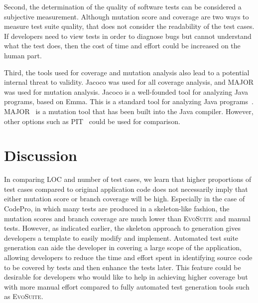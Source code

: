 Second, the determination of the quality of software tests can be considered a subjective measurement. Although mutation score and coverage are two ways to measure test suite quality, that does not consider the readability of the test cases. If developers need to view tests in order to diagnose bugs but cannot understand what the test does, then the cost of time and effort could be increased on the human part.

Third, the tools used for coverage and mutation analysis also lead to a potential internal threat to validity.  Jacoco was used for all coverage analysis, and MAJOR was used for mutation analysis.  Jacoco is a well-founded tool for analyzing Java programs, based on Emma.  This is a standard tool for analyzing Java programs~\cite{jacoco}.  MAJOR~\cite{just2011} is a mutation tool that has been built into the Java compiler. However, other options such as PIT~\cite{ pit2014} could be used for comparison. 


\section{Discussion}
\label{sec:discussion}

In comparing LOC and number of test cases, we learn that higher proportions of test cases compared to original application code does not necessarily imply that either mutation score or branch coverage will be high.  Especially in the case of CodePro, in which many tests are produced in a skeleton-like fashion, the mutation scores and branch coverage are much lower than  \textsc{EvoSuite} and manual tests. However, as indicated earlier, the skeleton approach to generation gives developers a template to easily modify and implement. Automated test suite generation can aide the developer in covering a large scope of the application, allowing developers to reduce the time and effort spent in identifying source code to be covered by tests and then enhance the tests later.  This feature could be desirable for developers who would like to help in achieving higher coverage but with more manual effort compared to fully automated test generation tools such as \textsc{EvoSuite}.

